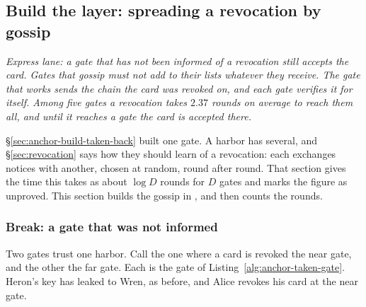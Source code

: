 %
%
\subsection{Build the layer: spreading a revocation by gossip}
\label{sec:anchor-build-told}

\noindent\emph{Express lane: a gate that has not been informed of a
revocation still accepts the card. Gates that gossip must not add to their lists
whatever they receive. The gate that works sends the chain the card was
revoked on, and each gate verifies it for itself. Among five gates a
revocation takes $2.37$ rounds on average to reach them all, and until it
reaches a gate the card is accepted there.}

\S\ref{sec:anchor-build-taken-back} built one gate. A harbor
has several, and \S\ref{sec:revocation} says how they should learn of a
revocation: each exchanges notices with another, chosen at random,
round after round. That section gives the time this takes as about
$\log D$ rounds for $D$ gates and marks the figure as unproved. This
section builds the gossip in \pdkernelname{}, and then counts the rounds.

\subsubsection{Break: a gate that was not informed}

Two gates trust one harbor. Call the one where a card is revoked the near
gate, and the other the far gate. Each is the gate of
Listing~\ref{alg:anchor-taken-gate}. Heron's key has leaked to Wren, as
before, and Alice revokes his card at the near gate.


